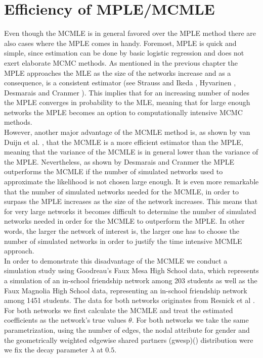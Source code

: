\documentclass[headsepline=true, abstracton]{scrartcl}
\begin{document}
\section*{Efficiency of MPLE/MCMLE}
Even though the MCMLE is in general favored over the MPLE method there are also cases where the MPLE comes in handy. Foremost, MPLE is quick and simple, since estimation can be done by basic logistic regression and does not exert elaborate MCMC methods. As mentioned in the previous chapter the MPLE approaches the MLE as the size of the networks increase and as a consequence, is a consistent estimator (see Strauss and Ikeda \cite{StraussIkeda1990}, Hyvarinen \cite{Hyvarinen2006}, Desmarais and Cranmer \cite{Desmarais.2012}). This implies that for an increasing number of nodes the MPLE converges in probability to the MLE, meaning that for large enough networks the MPLE becomes an option to computationally intensive MCMC methods.\\
However, another major advantage of the MCMLE method is, as shown by van Duijn et al. \cite{vanDuijnetal2009}, that the MCMLE is a more efficient estimator than the MPLE, meaning that the variance of the MCMLE is in general lower than the variance of the MPLE. Nevertheless, as shown by Desmarais and Cranmer \cite{Desmarais.2012} the MPLE outperforms the MCMLE if the number of simulated networks used to approximate the likelihood is not chosen large enough. It is even more remarkable that the number of simulated networks needed for the MCMLE, in order to surpass the MPLE increases as the size of the network increases. This means that for very large networks it becomes difficult to determine the number of simulated networks needed in order for the MCMLE to outperform the MPLE. In other words, the larger the network of interest is, the larger one has to choose the number of simulated networks in order to justify the time intensive MCMLE approach.\\[0.3cm]
\noindent In order to demonstrate this disadvantage of the MCMLE we conduct a simulation study using Goodreau's Faux Mesa High School data, which represents a simulation of an in-school friendship network among 203 students as well as the Faux Magnolia High School data, representing an in-school friendship network among 1451 students. The data for both networks originates from Resnick et al \cite{Resnicketal1997}.\\[0.3cm]
For both networks we first calculate the MCMLE and treat the estimated coefficients as the network's true values $\theta$. For both networks we take the same parametrization, using the number of edges, the nodal attribute for gender and the geometrically weighted edgewise shared partners (gwesp)(\cite{Hunter.2006}) distribution were we fix the decay parameter $\lambda$ at $0.5$.\\
\end{document}
